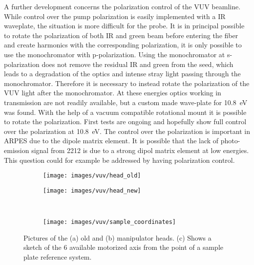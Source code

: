 A further development concerns the polarization control of the VUV beamline.
While control over the pump polarization is easily implemented with a IR waveplate, the situation is more difficult for the probe.
It is in principal possible to rotate the polarization of both IR and green beam before entering the fiber and create harmonics with the corresponding polarization, it is only possible to use the monochromator with p-polarization.
Using the monochromator at s-polarization does not remove the residual IR and green from the seed, which leads to a degradation of the optics and intense stray light passing through the monochromator.
Therefore it is necessary to instead rotate the polarization of the VUV light after the monochromator.
At these energies optics working in transmission are not readily available, but a custom made wave-plate for \qty{10.8}{\electronvolt} was found.
With the help of a vacuum compatible rotational mount it is possible to rotate the polarization.
First tests are ongoing and hopefully show full control over the polarization at \qty{10.8}{\electronvolt}.
The control over the polarization is important in ARPES due to the dipole matrix element.
It is possible that the lack of photo-emission signal from 2212 is due to a strong dipol matrix element at low energies.
This question could for example be addressed by having polarization control.

\begin{figure}[t]
	\centering
	\begin{subfigure}[b]{0.45\textwidth}
		\texttt{[image: images/vuv/head\_old]}
		\caption{}
	\end{subfigure}
	\begin{subfigure}[b]{0.45\textwidth}
		\texttt{[image: images/vuv/head\_new]}
		\caption{}
	\end{subfigure}
	\\
	\begin{subfigure}[b]{0.45\textwidth}
		\texttt{[image: images/vuv/sample\_coordinates]}
		\caption{}
	\end{subfigure}
	\caption{Pictures of the (a) old and (b) manipulator heads. (c) Shows a sketch of the 6 available motorized axis from the point of a sample plate reference system.}
	\label{fig:manip_head}
\end{figure}

